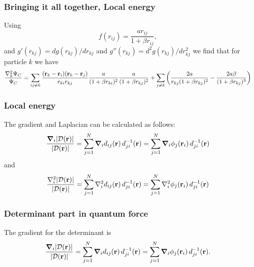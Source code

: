 \documentclass[compress]{beamer}
\newcommand{\matr}[1]{{\bf \cal{#1}}}
\renewcommand{\vec}[1]{\boldsymbol{#1}}
\renewcommand{\det}[1]{|#1|}
\begin{document}
\frame
{
  \frametitle{Bringing it all together, Local energy}
\begin{small}
{\scriptsize
Using 
\[
f(r_{ij})= \frac{ar_{ij}}{1+\beta r_{ij}},
\]
and $g'(r_{kj})=dg(r_{kj})/dr_{kj}$ and 
$g''(r_{kj})=d^2g(r_{kj})/dr_{kj}^2$  we find that for particle  $k$
we have
\[
  \frac{\nabla^2_k \Psi_C}{\Psi_C }=
\sum_{ij\ne k}\frac{({\bf r}_k-{\bf r}_i)({\bf r}_k-{\bf r}_j)}{r_{ki}r_{kj}}\frac{a}{(1+\beta r_{ki})^2}
\frac{a}{(1+\beta r_{kj})^2}+
\sum_{j\ne k}\left(\frac{2a}{r_{kj}(1+\beta r_{kj})^2}-\frac{2a\beta}{(1+\beta r_{kj})^3}\right)
\]
}
\end{small}
}

\frame
{
  \frametitle{Local energy}
\begin{small}
{\scriptsize
The gradient and
Laplacian can be calculated as follows:
\[
\frac{\vec\nabla_i\det{\matr D(\mathbf{r})}}
{\det{\matr D(\mathbf{r})}} =
\sum_{j=1}^N \vec\nabla_i d_{ij}(\mathbf{r})\,
d_{ji}^{-1}(\mathbf{r}) =
\sum_{j=1}^N \vec\nabla_i \phi_j(\mathbf{r}_i)\,
d_{ji}^{-1}(\mathbf{r})
\]
and
\[
\frac{\nabla^2_i\det{\matr D(\mathbf{r})}}
{\det{\matr D(\mathbf{r})}} =
\sum_{j=1}^N \nabla^2_i d_{ij}(\mathbf{r})\,
d_{ji}^{-1}(\mathbf{r}) =
\sum_{j=1}^N \nabla^2_i \phi_j(\mathbf{r}_i)\,
d_{ji}^{-1}(\mathbf{r})
\]
}
\end{small}
}



\frame
{
  \frametitle{Determinant part in quantum force}
\begin{small}
{\scriptsize
The gradient for the determinant is 
\[
\frac{\vec\nabla_i\det{\matr D(\mathbf{r})}}
{\det{\matr D(\mathbf{r})}} =
\sum_{j=1}^N \vec\nabla_i d_{ij}(\mathbf{r})\,
d_{ji}^{-1}(\mathbf{r}) =
\sum_{j=1}^N \vec\nabla_i \phi_j(\mathbf{r}_i)\,
d_{ji}^{-1}(\mathbf{r}).
\]
}
\end{small}
}
\end{document}
